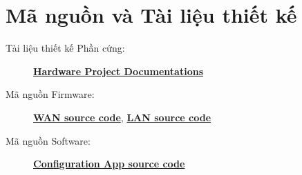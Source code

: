 \chapter{Mã nguồn và Tài liệu thiết kế}
    \begin{description}
        \item[Tài liệu thiết kế Phần cứng:] \href{https://drive.google.com/drive/folders/1IrFrjBZtOsbTgmNe-64czuGsoSjKp458?usp=drive_link}{\textbf{Hardware Project Documentations}}
        \item[Mã nguồn Firmware:] \href{https://github.com/NguyenHoangTrieu/DA2_esp}{\textbf{WAN source code}}, \href{https://github.com/NguyenHoangTrieu/DA2_esp_LAN}{\textbf{LAN source code}}
        \item[Mã nguồn Software:] \href{https://github.com/NguyenHoangTrieu/DATN_config_app}{\textbf{Configuration App source code}}
    \end{description}